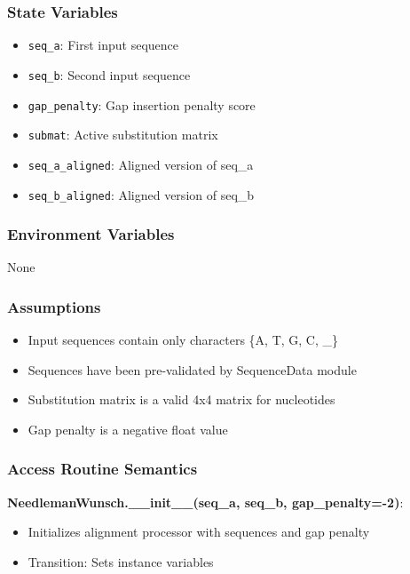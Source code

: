 \documentclass[12pt, titlepage]{article}
\begin{document}
\subsubsection{State Variables}

\begin{itemize}
    \item \texttt{seq\_a}: First input sequence
    \item \texttt{seq\_b}: Second input sequence
    \item \texttt{gap\_penalty}: Gap insertion penalty score
    \item \texttt{submat}: Active substitution matrix
    \item \texttt{seq\_a\_aligned}: Aligned version of seq\_a
    \item \texttt{seq\_b\_aligned}: Aligned version of seq\_b
\end{itemize}

\subsubsection{Environment Variables}

None

\subsubsection{Assumptions}

\begin{itemize}
    \item Input sequences contain only characters \{A, T, G, C, \_\}
    \item Sequences have been pre-validated by SequenceData module
    \item Substitution matrix is a valid 4x4 matrix for nucleotides
    \item Gap penalty is a negative float value
\end{itemize}

\subsubsection{Access Routine Semantics}

\noindent \textbf{NeedlemanWunsch.\_\_init\_\_(seq\_a, seq\_b, gap\_penalty=-2)}:
\begin{itemize}
    \item Initializes alignment processor with sequences and gap penalty
    \item Transition: Sets instance variables
\end{itemize}
\end{document}
